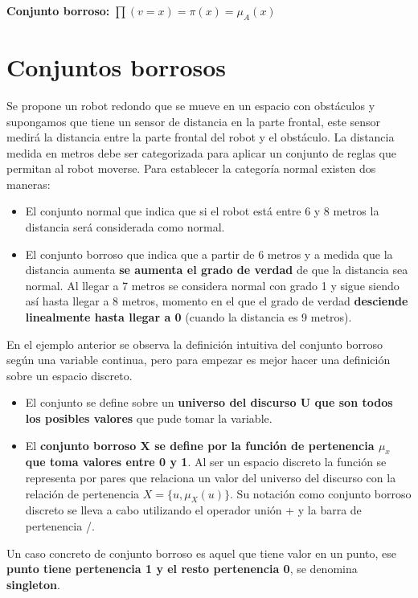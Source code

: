 \documentclass[12pt, twoside, openright]{report} %
\begin{document}
\textbf{Conjunto borroso:} $\prod(v=x)=\pi(x)=\mu_A(x)$

\section{Conjuntos borrosos}
Se propone un robot redondo que se mueve en un espacio con obstáculos y supongamos que tiene un sensor de distancia en la parte frontal, este sensor medirá la distancia entre la parte frontal del robot y el obstáculo. La distancia medida en metros debe ser categorizada para aplicar un conjunto de reglas que permitan al robot moverse. Para establecer la categoría normal existen dos maneras:
\begin{itemize}
	\item El conjunto normal que indica que si el robot está entre 6 y 8 metros la distancia será considerada como normal.
	\item El conjunto borroso que indica que a partir de 6 metros y a medida que la distancia aumenta \textbf{se aumenta el grado de verdad} de que la distancia sea normal. Al llegar a 7 metros se considera normal con grado 1 y sigue siendo así hasta llegar a 8 metros, momento en el que el grado de verdad \textbf{desciende linealmente hasta llegar a 0} (cuando la distancia es 9 metros).
\end{itemize}
En el ejemplo anterior se observa la definición intuitiva del conjunto borroso según una variable continua, pero para empezar es mejor hacer una definición sobre un espacio discreto.
\begin{itemize}
	\item El conjunto se define sobre un \textbf{universo del discurso U que son todos los posibles valores} que pude tomar la variable.
	\item El \textbf{conjunto borroso X se define por la función de pertenencia $\mu_x$ que toma valores entre 0 y 1}. Al ser un espacio discreto la función se representa por pares que relaciona un valor del universo del discurso con la relación de pertenencia $X=\{u, \mu_X(u)\}$. Su notación como conjunto borroso discreto se lleva a cabo utilizando el operador unión + y la barra de pertenencia /.
\end{itemize}

Un caso concreto de conjunto borroso es aquel que tiene valor en un punto, ese \textbf{punto tiene pertenencia 1 y el resto pertenencia 0}, se denomina \textbf{singleton}.
\end{document}
